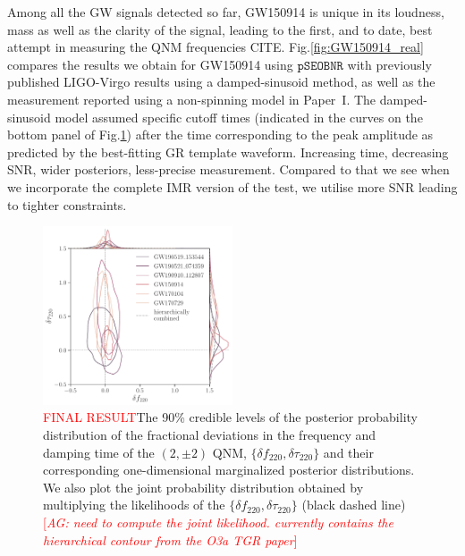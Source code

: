 \documentclass[twocolumn,prd,superscriptaddress,amsfonts,amssymb,amsmath,preprintnumbers]{revtex4-1}
\newcommand{\paperone}{Paper~I\xspace}
\newcommand{\abhi}[1]{\textcolor{red}{[\textit{AG: #1}]}}
\newcommand{\df}[1]{\delta f_{\text{#1}}}
\newcommand{\dtau}[1]{\delta \tau_{\text{#1}}}
\newcommand{\pSEOB}{\texttt{pSEOBNR}}
\begin{document}
Among all the GW signals detected so far, GW150914 is unique in its loudness, mass as well as the clarity of the signal, leading to the first, and to date, best attempt in measuring the QNM frequencies CITE.  Fig.\ref{fig:GW150914_real} compares the results we obtain for GW150914 using $\pSEOB$ with previously published LIGO-Virgo results using a damped-sinusoid method, as well as the measurement reported using a non-spinning model in \paperone. The damped-sinusoid model assumed specific cutoff times (indicated in the curves on the bottom panel of Fig.\ref{fig:o1o2_events}) after the time corresponding to the peak amplitude as predicted by the best-fitting GR template waveform. Increasing time, decreasing SNR, wider posteriors, less-precise measurement. Compared to that we see when we incorporate the complete IMR version of the test, we utilise more SNR leading to tighter constraints.

\begin{figure}[h!]
	\includegraphics[width=0.5\textwidth]{figures/O1O2_realevents.pdf}
	\caption{\textcolor{red}{FINAL RESULT}The 90\% credible levels of the posterior probability distribution of the fractional deviations in the frequency and damping time of the $(2,\pm 2)$ QNM, $\{\df{220},\dtau{220}\}$ and their corresponding one-dimensional marginalized posterior distributions. We also plot the joint probability distribution obtained by multiplying the likelihoods of the $\{\df{220},\dtau{220}\}$ (black dashed line) \abhi{need to compute the joint likelihood. currently contains the hierarchical contour from the O3a TGR paper}}
	\label{fig:o1o2_events}
\end{figure}
\end{document}

